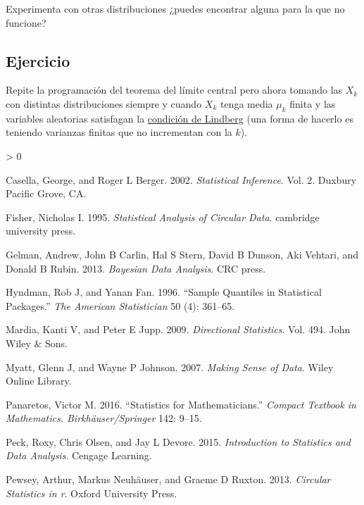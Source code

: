 \documentclass[
]{book}
\newlength{\cslhangindent}
\newenvironment{CSLReferences}[2] %
 {%
  \setlength{\parindent}{0pt}
  \ifodd #1 \everypar{\setlength{\hangindent}{\cslhangindent}}\ignorespaces\fi
  \ifnum #2 > 0
  \setlength{\parskip}{#2\baselineskip}
  \fi
 }%
 {}
\begin{document}
Experimenta con otras distribuciones ¿puedes encontrar alguna para la que no funcione?

\hypertarget{ejercicio-14}{%
\subsection{Ejercicio}\label{ejercicio-14}}

Repite la programación del teorema del límite central pero ahora tomando las \(X_k\) con distintas distribuciones siempre y cuando \(X_k\) tenga media \(\mu_k\) finita y las variables aleatorias satisfagan la \href{https://en.wikipedia.org/wiki/Lindeberg\%27s_condition}{condición de Lindberg} (una forma de hacerlo es teniendo varianzas finitas que no incrementan con la \(k\)).

\hypertarget{refs}{}
\begin{CSLReferences}{1}{0}
\leavevmode\hypertarget{ref-casella2002statistical}{}%
Casella, George, and Roger L Berger. 2002. \emph{Statistical Inference}. Vol. 2. Duxbury Pacific Grove, CA.

\leavevmode\hypertarget{ref-fisher1995statistical}{}%
Fisher, Nicholas I. 1995. \emph{Statistical Analysis of Circular Data}. cambridge university press.

\leavevmode\hypertarget{ref-gelman2013bayesian}{}%
Gelman, Andrew, John B Carlin, Hal S Stern, David B Dunson, Aki Vehtari, and Donald B Rubin. 2013. \emph{Bayesian Data Analysis}. CRC press.

\leavevmode\hypertarget{ref-hyndman1996sample}{}%
Hyndman, Rob J, and Yanan Fan. 1996. {``Sample Quantiles in Statistical Packages.''} \emph{The American Statistician} 50 (4): 361--65.

\leavevmode\hypertarget{ref-mardia2009directional}{}%
Mardia, Kanti V, and Peter E Jupp. 2009. \emph{Directional Statistics}. Vol. 494. John Wiley \& Sons.

\leavevmode\hypertarget{ref-myatt2007making}{}%
Myatt, Glenn J, and Wayne P Johnson. 2007. \emph{Making Sense of Data}. Wiley Online Library.

\leavevmode\hypertarget{ref-panaretos2016statistics}{}%
Panaretos, Victor M. 2016. {``Statistics for Mathematicians.''} \emph{Compact Textbook in Mathematics. Birkh{ä}user/Springer} 142: 9--15.

\leavevmode\hypertarget{ref-peck2015introduction}{}%
Peck, Roxy, Chris Olsen, and Jay L Devore. 2015. \emph{Introduction to Statistics and Data Analysis}. Cengage Learning.

\leavevmode\hypertarget{ref-pewsey2013circular}{}%
Pewsey, Arthur, Markus Neuhäuser, and Graeme D Ruxton. 2013. \emph{Circular Statistics in r}. Oxford University Press.


\end{CSLReferences}
\end{document}
